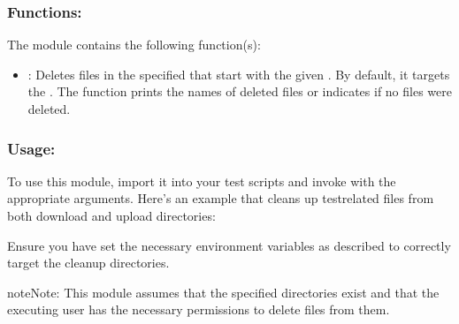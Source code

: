 \documentclass[letterpaper,10pt,english]{sphinxmanual}
\begin{document}
\begin{fulllineitems}
\subsubsection{Functions:}
\label{\detokenize{cleanup:functions}}
\sphinxAtStartPar
The module contains the following function(s):
\begin{itemize}
\item {} 
\sphinxAtStartPar
{}: Deletes files in the specified  that 
start with the given . By default, it targets the . The function prints the names of 
deleted files or indicates if no files were deleted.

\end{itemize}


\subsubsection{Usage:}
\label{\detokenize{cleanup:usage}}
\sphinxAtStartPar
To use this module, import it into your test scripts and invoke  with the appropriate 
arguments. Here’s an example that cleans up test\sphinxhyphen{}related files from both download and upload directories:

\begin{sphinxVerbatim}[commandchars=\\\{\}]
     

 

 
\end{sphinxVerbatim}

\sphinxAtStartPar
Ensure you have set the necessary environment variables as described to correctly target the cleanup directories.

\begin{sphinxadmonition}{note}{Note:}
\sphinxAtStartPar
This module assumes that the specified directories exist and that the executing user has the necessary 
permissions to delete files from them.
\end{sphinxadmonition}

\end{fulllineitems}
\end{document}
